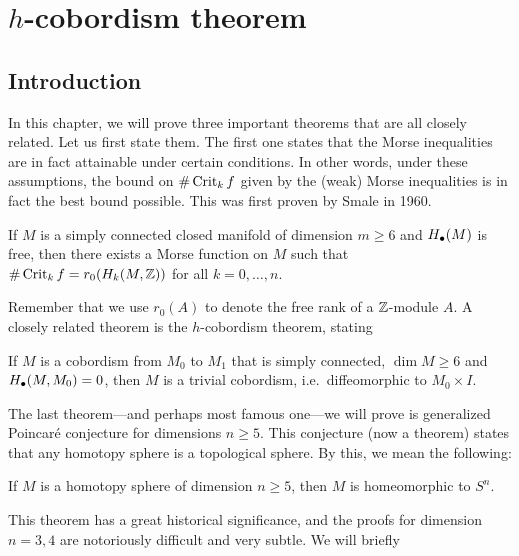 \chapter{$h$-cobordism theorem}
\label{chap:h-cobord}
\section{Introduction}

In this chapter, we will prove three important theorems that are all closely related.
Let us first state them.
The first one states that the Morse inequalities are in fact attainable under certain conditions.
In other words, under these assumptions, the bound on $\# \operatorname{Crit}_k f$ given by the (weak) Morse inequalities is in fact the best bound possible. This was first proven by Smale in 1960.
\begin{theorem}
    If $M$ is a simply connected closed manifold of dimension  $m \ge  6$ and $H_\bullet(M)$ is free, then there exists a Morse function on  $M$ such that  $\# \operatorname{Crit}_k f = r_0(H_k(M, \mathbb{Z}))$ for all $k = 0, \ldots, n$.
\end{theorem}
Remember that we use $r_0(A)$ to denote the free rank of a $\mathbb{Z}$-module $A$.
A closely related theorem is the $h$-cobordism theorem, stating
\begin{theorem}
    If $M$ is a cobordism from $M_0$ to $M_1$ that is simply connected, $\dim M \ge 6$ and $H_{\bullet}(M,M_0) = 0$, then $M$ is a trivial cobordism, i.e.\ diffeomorphic to  $ M_0 \times I$.
\end{theorem}
The last theorem---and perhaps most famous one---we will prove is generalized Poincaré conjecture for dimensions $n \ge 5$.
This conjecture (now a theorem) states that any homotopy sphere is a topological sphere. By this, we mean the following:
\begin{theorem}
    If $M$ is a homotopy sphere of dimension  $n \ge 5$, then $M$ is homeomorphic to  $S^{n}$.
\end{theorem}
This theorem has a great historical significance, and the proofs for dimension $n = 3, 4$ are notoriously difficult and very subtle. We will briefly 

